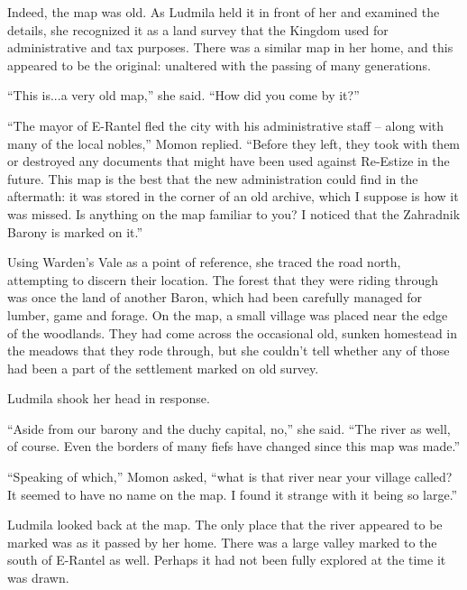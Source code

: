  

Indeed, the map was old. As Ludmila held it in front of her and examined the details, she recognized it as a land survey that the Kingdom used for administrative and tax purposes. There was a similar map in her home, and this appeared to be the original: unaltered with the passing of many generations.

 

“This is...a very old map,” she said. “How did you come by it?”

 

“The mayor of E-Rantel fled the city with his administrative staff – along with many of the local nobles,” Momon replied. “Before they left, they took with them or destroyed any documents that might have been used against Re-Estize in the future. This map is the best that the new administration could find in the aftermath: it was stored in the corner of an old archive, which I suppose is how it was missed. Is anything on the map familiar to you? I noticed that the Zahradnik Barony is marked on it.”

 

Using Warden’s Vale as a point of reference, she traced the road north, attempting to discern their location. The forest that they were riding through was once the land of another Baron, which had been carefully managed for lumber, game and forage. On the map, a small village was placed near the edge of the woodlands. They had come across the occasional old, sunken homestead in the meadows that they rode through, but she couldn't tell whether any of those had been a part of the settlement marked on old survey.

 

Ludmila shook her head in response.

 

“Aside from our barony and the duchy capital, no,” she said. “The river as well, of course. Even the borders of many fiefs have changed since this map was made.”

 

“Speaking of which,” Momon asked, “what is that river near your village called? It seemed to have no name on the map. I found it strange with it being so large.”

 

Ludmila looked back at the map. The only place that the river appeared to be marked was as it passed by her home. There was a large valley marked to the south of E-Rantel as well. Perhaps it had not been fully explored at the time it was drawn.

